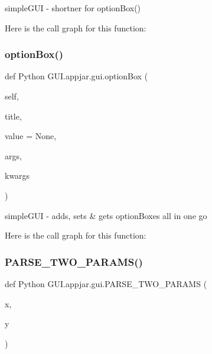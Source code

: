 \begin{DoxyVerb}
\begin{DoxyVerb}simpleGUI - shortner for optionBox() \end{DoxyVerb}
 Here is the call graph for this function\+:
\mbox{\label{class_python_01_g_u_i_1_1appjar_1_1gui_aad650f8b6e6d227317d39f03109f0e70}} 
\subsubsection{\texorpdfstring{option\+Box()}{optionBox()}}
{\footnotesize\ttfamily def Python G\+U\+I.\+appjar.\+gui.\+option\+Box (\begin{DoxyParamCaption}\item[{}]{self,  }\item[{}]{title,  }\item[{}]{value = {\ttfamily None},  }\item[{}]{args,  }\item[{}]{kwargs }\end{DoxyParamCaption})}

\begin{DoxyVerb}simpleGUI - adds, sets & gets optionBoxes all in one go \end{DoxyVerb}
 Here is the call graph for this function\+:
\mbox{\label{class_python_01_g_u_i_1_1appjar_1_1gui_ab64e0c4920c912ae567e1fa9dd3c0c9a}} 
\subsubsection{\texorpdfstring{P\+A\+R\+S\+E\+\_\+\+T\+W\+O\+\_\+\+P\+A\+R\+A\+M\+S()}{PARSE\_TWO\_PARAMS()}}
{\footnotesize\ttfamily def Python G\+U\+I.\+appjar.\+gui.\+P\+A\+R\+S\+E\+\_\+\+T\+W\+O\+\_\+\+P\+A\+R\+A\+MS (\begin{DoxyParamCaption}\item[{}]{x,  }\item[{}]{y }\end{DoxyParamCaption})\hspace{0.3cm}{\ttfamily [static]}}


\end{DoxyVerb}
